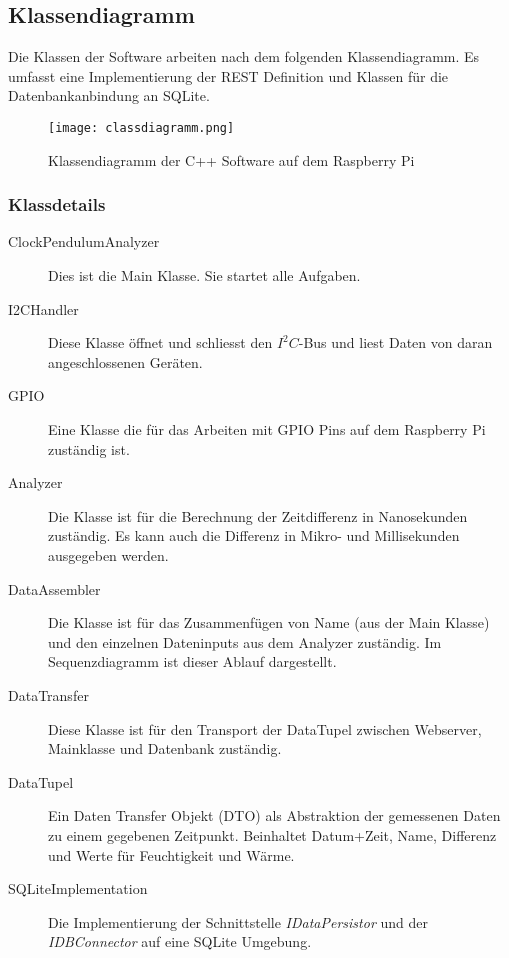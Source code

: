 \subsection{Klassendiagramm}
Die Klassen der Software arbeiten nach dem folgenden Klassendiagramm. Es umfasst eine Implementierung der REST Definition und Klassen für die Datenbankanbindung an SQLite.
\begin{figure}[H]
    \centering
    \texttt{[image: classdiagramm.png]}
    \caption{Klassendiagramm der C++ Software auf dem Raspberry Pi}
\end{figure}
\subsubsection{Klassdetails}
	\begin{description}
        \item[ClockPendulumAnalyzer] Dies ist die Main Klasse. Sie startet alle Aufgaben.
        \item[I2CHandler] Diese Klasse öffnet und schliesst den $I^2C$-Bus und liest Daten von daran angeschlossenen Geräten.
        \item[GPIO] Eine Klasse die für das Arbeiten mit GPIO Pins auf dem Raspberry Pi zuständig ist.
        \item[Analyzer] Die Klasse ist für die Berechnung der Zeitdifferenz in Nanosekunden zuständig. Es kann auch die Differenz in Mikro- und Millisekunden ausgegeben werden.
        \item[DataAssembler] Die Klasse ist für das Zusammenfügen von Name (aus der Main Klasse) und den einzelnen Dateninputs aus dem Analyzer zuständig. Im Sequenzdiagramm ist dieser Ablauf dargestellt. 
        \item[DataTransfer] Diese Klasse ist für den Transport der DataTupel zwischen Webserver, Mainklasse und Datenbank zuständig.
        \item[DataTupel] Ein Daten Transfer Objekt (DTO) als Abstraktion der gemessenen Daten zu einem gegebenen Zeitpunkt. Beinhaltet Datum+Zeit, Name, Differenz und Werte für Feuchtigkeit und Wärme.
        \item[SQLiteImplementation] Die Implementierung der Schnittstelle \textit{IDataPersistor} und der \textit{IDBConnector} auf eine SQLite Umgebung.
    \end{description}
